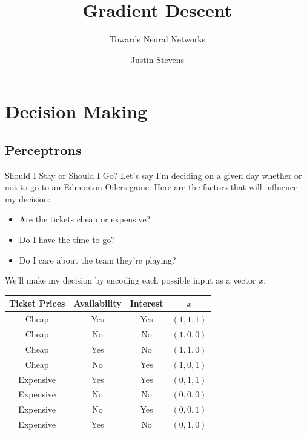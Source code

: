 \documentclass[xcolor=dvipsnames, fontsize=11pt, %
pagesize, %
parskip=half-, t]{beamer}
\title[Artificial Intelligence for Beginners]{Gradient Descent}
\subtitle{Towards Neural Networks}
\author[Justin Stevens]{\large Justin Stevens} %
\date{}
\begin{document}
	\renewcommand{\thefootnote}{\fnsymbol{footnote}}
	\begin{frame}[c]
	\centering
	\titlepage
\end{frame}
\section{Decision Making}
\subsection{Perceptrons}
\begin{frame}{Should I Stay or Should I Go?}
Let's say I'm deciding on a given day whether or not to go to  an Edmonton Oilers game. Here are the factors that will influence my decision: \pause 
\begin{itemize}
\item Are the tickets cheap or expensive?
\item Do I have the time to go?
\item Do I care about the team they're playing?
\end{itemize} \pause 
We'll make my decision by encoding each possible input as a vector $\bar{x}$: \pause
\begin{table} \center 
\begin{tabular}{ccc|c}
Ticket Prices & Availability & Interest & $\bar{x}$\\ \hline 
Cheap & Yes & Yes & $(1,1,1)$ \\
Cheap & No & No & $(1,0,0)$ \\
Cheap & Yes & No & $(1,1,0)$ \\
Cheap & No & Yes & $(1,0,1)$  \\
Expensive & Yes & Yes & $(0,1,1)$ \\
Expensive & No & No & $(0,0,0)$ \\
Expensive & No & Yes & $(0,0,1)$ \\
Expensive & Yes & No & $(0,1,0)$ 
\end{tabular}
\end{table}
\end{frame}
\end{document}
